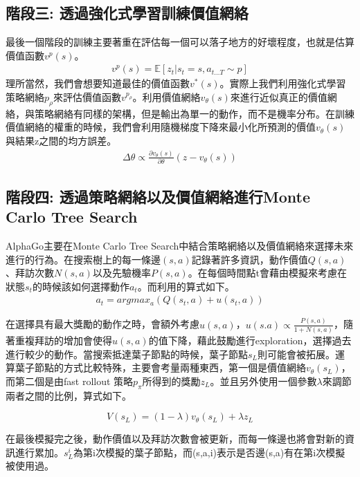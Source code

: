 \documentclass[a4paper,12pt]{article}
\begin{document}
\subsection{階段三: 透過強化式學習訓練價值網絡}
\qquad 最後一個階段的訓練主要著重在評估每一個可以落子地方的好壞程度，也就是估算價值函數$v^{p}(s)$。
\begin{align}
&v^{p}(s)=\mathbb{E}[z_{t}|s_{t}=s,a_{t...T}\sim p]&
\end{align}
\qquad 理所當然，我們會想要知道最佳的價值函數$v^{*}(s)$。實際上我們利用強化式學習策略網絡$p_{\rho}$來評估價值函數$v^{p_{\rho}}$。利用價值網絡$v_{\theta}(s)$來進行近似真正的價值網絡，與策略網絡有同樣的架構，但是輸出為單一的動作，而不是機率分布。在訓練價值網絡的權重的時候，我們會利用隨機梯度下降來最小化所預測的價值$v_{\theta}(s)$與結果z之間的均方誤差。
\begin{align}
&\Delta\theta\propto\frac{\partial v_{\theta}(s)}{\partial\theta}(z-v_{\theta}(s))&
\end{align}


\subsection{階段四: 透過策略網絡以及價值網絡進行Monte Carlo Tree Search}
\qquad AlphaGo主要在Monte Carlo Tree Search中結合策略網絡以及價值網絡來選擇未來進行的行為。在搜索樹上的每一條邊$(s,a)$記錄著許多資訊，動作價值$Q(s,a)$、拜訪次數$N(s,a)$以及先驗機率$P(s,a)$。在每個時間點t會藉由模擬來考慮在狀態$s_{t}$的時候該如何選擇動作$a_{t}$。而利用的算式如下。
\begin{align}
&a_{t}=argmax_{a}(Q(s_{t},a)+u(s_{t},a))&
\end{align}

\quad 在選擇具有最大獎勵的動作之時，會額外考慮$u(s,a)$，$u(s.a)\propto\frac{P(s,a)}{1+N(s,a)}$，隨著重複拜訪的增加會使得$u(s,a)$的值下降，藉此鼓勵進行exploration，選擇過去進行較少的動作。當搜索抵達葉子節點的時候，葉子節點$s_{L}$則可能會被拓展。運算葉子節點的方式比較特殊，主要會考量兩種東西，第一個是價值網絡$v_{\theta}(s_{L})$，而第二個是由fast rollout 策略$p_{\pi}$所得到的獎勵$z_{L}$。並且另外使用一個參數$\lambda$來調節兩者之間的比例，算式如下。


\begin{equation}
V(s_{L})=(1-\lambda)v_{\theta}(s_{L})+\lambda z_{L}
\end{equation}

\quad 在最後模擬完之後，動作價值以及拜訪次數會被更新，而每一條邊也將會對新的資訊進行累加。$s^{i}_{L}$為第i次模擬的葉子節點，而(s,a,i)表示是否邊(s,a)有在第i次模擬被使用過。
\end{document}
